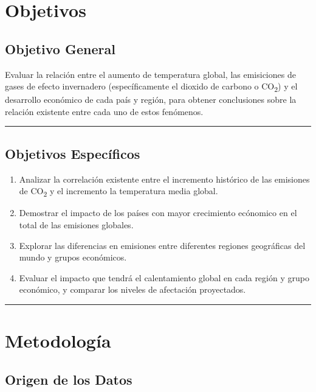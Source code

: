 \documentclass[
]{book}
\providecommand{\tightlist}{%
  \setlength{\itemsep}{0pt}\setlength{\parskip}{0pt}}
\begin{document}
\chapter{Objetivos}\label{objetivos}

\section{Objetivo General}\label{objetivo-general}

Evaluar la relación entre el aumento de temperatura global, las emisiciones de gases de efecto invernadero (específicamente el dioxido de carbono o CO\textsubscript{2}) y el desarrollo económico de cada país y región, para obtener conclusiones sobre la relación existente entre cada uno de estos fenómenos.

\begin{center}\rule{0.5\linewidth}{0.5pt}\end{center}

\section{Objetivos Específicos}\label{objetivos-especuxedficos}

\begin{enumerate}
\def\labelenumi{\arabic{enumi}.}
\tightlist
\item
  Analizar la correlación existente entre el incremento histórico de las emisiones de CO\textsubscript{2} y el incremento la temperatura media global.
\item
  Demostrar el impacto de los países con mayor crecimiento ecónomico en el total de las emisiones globales.
\item
  Explorar las diferencias en emisiones entre diferentes regiones geográficas del mundo y grupos económicos.
\item
  Evaluar el impacto que tendrá el calentamiento global en cada región y grupo económico, y comparar los niveles de afectación proyectados.
\end{enumerate}

\begin{center}\rule{0.5\linewidth}{0.5pt}\end{center}

\chapter{Metodología}\label{metodologuxeda}

\section{Origen de los Datos}\label{origen-de-los-datos}
\end{document}
